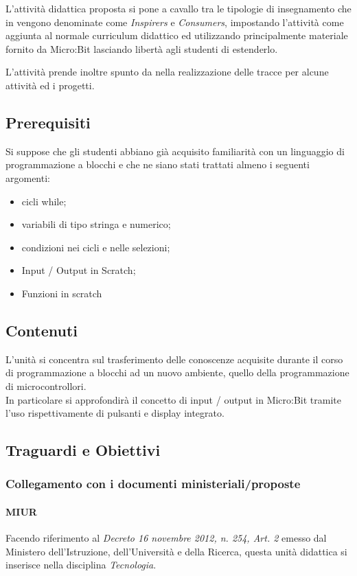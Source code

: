 \documentclass[../../relazione.tex]{subfiles}
\begin{document}
L'attività didattica proposta si pone a cavallo tra le tipologie di insegnamento che in \cite{10.1145/3137065.3137083} vengono denominate come \textit{Inspirers} e \textit{Consumers}, impostando l'attività come aggiunta al normale curriculum didattico ed utilizzando principalmente materiale fornito da Micro:Bit lasciando libertà agli studenti di estenderlo. 

L'attività prende inoltre spunto da \cite{10.1145/3017680.3017749} nella realizzazione delle tracce per alcune attività ed i progetti.

\subsection{Prerequisiti}
Si suppose che gli studenti abbiano già acquisito familiarità con un linguaggio di programmazione a blocchi e che ne siano stati trattati almeno i seguenti argomenti:
\begin{itemize}
	\item cicli while;
	\item variabili di tipo stringa e numerico;
	\item condizioni nei cicli e nelle selezioni;
	\item Input / Output in Scratch;
	\item Funzioni in scratch
\end{itemize}

\subsection{Contenuti}
L'unità si concentra sul trasferimento delle conoscenze acquisite durante il corso di programmazione a blocchi ad un nuovo ambiente, quello della programmazione di microcontrollori.\\
In particolare si approfondirà il concetto di input / output in Micro:Bit tramite l'uso rispettivamente di pulsanti e display integrato. 

\subsection{Traguardi e Obiettivi}

\subsubsection{Collegamento con i documenti ministeriali/proposte}
\paragraph{MIUR}
Facendo riferimento al \textit{Decreto 16 novembre 2012, n. 254, Art. 2} \cite{MIURWeb, MIUR254} emesso dal Ministero dell'Istruzione, dell'Università e della Ricerca, questa unità didattica si inserisce nella disciplina \textit{Tecnologia}.
\end{document}
